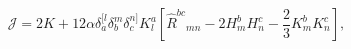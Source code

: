 \begin{equation} \label{J}
\mathcal{J} =2K+12  \alpha \delta^{[l}_a\delta^{m}_b\delta^{n]}_c
 K^a_l \left[ \widehat R^{bc}{}_{mn}-2H^b_mH^c_n 
-\frac{2}{3} K^b_mK^c_n \right],
\end{equation}

